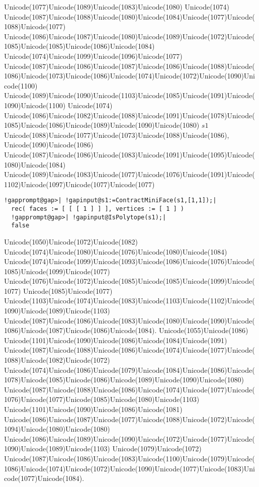 \documentclass[a4paper,11pt]{report}
\begin{document}
{{{Unicode(1077)Unicode(1089)Unicode(1083)Unicode(1080) Unicode(1074)
Unicode(1087)Unicode(1088)Unicode(1080)Unicode(1084)Unicode(1077)Unicode(1088)Unicode(1077)
Unicode(1086)Unicode(1087)Unicode(1080)Unicode(1089)Unicode(1072)Unicode(1085)Unicode(1085)Unicode(1086)Unicode(1084)
Unicode(1074)Unicode(1099)Unicode(1096)Unicode(1077)
Unicode(1087)Unicode(1086)Unicode(1087)Unicode(1086)Unicode(1088)Unicode(1086)Unicode(1073)Unicode(1086)Unicode(1074)Unicode(1072)Unicode(1090)Unicode(1100)
Unicode(1089)Unicode(1090)Unicode(1103)Unicode(1085)Unicode(1091)Unicode(1090)Unicode(1100)
Unicode(1074)
Unicode(1086)Unicode(1082)Unicode(1088)Unicode(1091)Unicode(1078)Unicode(1085)Unicode(1086)Unicode(1089)Unicode(1090)Unicode(1080) $s1$ Unicode(1088)Unicode(1077)Unicode(1073)Unicode(1088)Unicode(1086),
Unicode(1090)Unicode(1086)
Unicode(1087)Unicode(1086)Unicode(1083)Unicode(1091)Unicode(1095)Unicode(1080)Unicode(1084)
Unicode(1089)Unicode(1083)Unicode(1077)Unicode(1076)Unicode(1091)Unicode(1102)Unicode(1097)Unicode(1077)Unicode(1077) 
\begin{Verbatim}[commandchars=!@|,fontsize=\small,frame=single,label=Пример]
  !gapprompt@gap>| !gapinput@s1:=ContractMiniFace(s1,[1,1]);|
  rec( faces := [ [ [ 1 ] ] ], vertices := [ 1 ] )
  !gapprompt@gap>| !gapinput@IsPolytope(s1);|
  false
\end{Verbatim}
 Unicode(1050)Unicode(1072)Unicode(1082)
Unicode(1074)Unicode(1080)Unicode(1076)Unicode(1080)Unicode(1084)
Unicode(1074)Unicode(1099)Unicode(1093)Unicode(1086)Unicode(1076)Unicode(1085)Unicode(1099)Unicode(1077)
Unicode(1076)Unicode(1072)Unicode(1085)Unicode(1085)Unicode(1099)Unicode(1077)
Unicode(1085)Unicode(1077)
Unicode(1103)Unicode(1074)Unicode(1083)Unicode(1103)Unicode(1102)Unicode(1090)Unicode(1089)Unicode(1103)
Unicode(1087)Unicode(1086)Unicode(1083)Unicode(1080)Unicode(1090)Unicode(1086)Unicode(1087)Unicode(1086)Unicode(1084).
Unicode(1055)Unicode(1086)
Unicode(1101)Unicode(1090)Unicode(1086)Unicode(1084)Unicode(1091)
Unicode(1087)Unicode(1088)Unicode(1086)Unicode(1074)Unicode(1077)Unicode(1088)Unicode(1082)Unicode(1072)
Unicode(1074)Unicode(1086)Unicode(1079)Unicode(1084)Unicode(1086)Unicode(1078)Unicode(1085)Unicode(1086)Unicode(1089)Unicode(1090)Unicode(1080)
Unicode(1087)Unicode(1088)Unicode(1086)Unicode(1074)Unicode(1077)Unicode(1076)Unicode(1077)Unicode(1085)Unicode(1080)Unicode(1103)
Unicode(1101)Unicode(1090)Unicode(1086)Unicode(1081)
Unicode(1086)Unicode(1087)Unicode(1077)Unicode(1088)Unicode(1072)Unicode(1094)Unicode(1080)Unicode(1080)
Unicode(1086)Unicode(1089)Unicode(1090)Unicode(1072)Unicode(1077)Unicode(1090)Unicode(1089)Unicode(1103)
Unicode(1079)Unicode(1072)
Unicode(1087)Unicode(1086)Unicode(1083)Unicode(1100)Unicode(1079)Unicode(1086)Unicode(1074)Unicode(1072)Unicode(1090)Unicode(1077)Unicode(1083)Unicode(1077)Unicode(1084). }

}}
\end{document}
